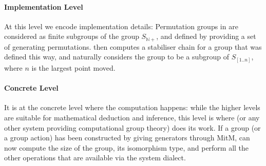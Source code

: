 \paragraph{Implementation Level}
At this level we encode implementation details: Permutation groups in \GAP
are considered as finite subgroups of the group $S_{\mathbb{N}+}$, and defined by
providing a set of generating permutations. \GAP then computes a stabiliser chain
for a group that was defined this way, and naturally considers the group to be a
subgroup of $S_{[1..n]}$, where $n$ is the largest point moved.

\paragraph{Concrete Level}
It is at the concrete level where the computation happens: while the higher levels
are suitable for mathematical deduction and inference, this level is where \GAP
(or any other system providing computational group theory) does its work.
If a group (or a group action) has been constructed by giving generators
through MitM, \GAP can now compute the size of the group, its isomorphism type,
and perform all the other operations that are available via the \GAP system
dialect.

